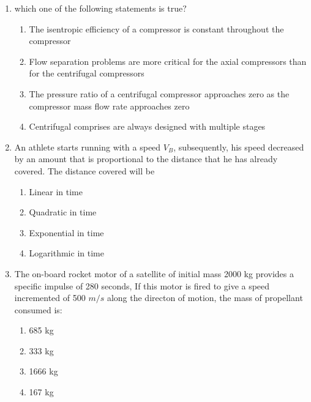 \documentclass[journal]{IEEEtran}
\begin{document}
\begin{enumerate}[start=35]
\begin{multicols}{2}
\begin{enumerate}
        \item Nickel alloy 
        \item Aluminum alloy
    \end{enumerate}
\end{multicols}
\item which one of the following statements is true$?$
\begin{enumerate}
        \item The isentropic efficiency of a compressor is constant throughout the compressor 
        \item Flow separation problems are more critical for the axial compressors than for the centrifugal compressors
        \item The pressure ratio of a centrifugal compressor approaches zero as the compressor mass flow rate approaches zero
        \item Centrifugal comprises are always designed with multiple stages
    \end{enumerate}
\item  An athlete starts running with a speed  $V_B$, subsequently, his speed decreased by an amount that is proportional to the distance that he has already covered. The distance covered will be
\begin{enumerate}
       \item Linear in time
       \item Quadratic in time
       \item Exponential in time
       \item Logarithmic in time 
   \end{enumerate}
\item The on-board rocket motor of a satellite of initial mass 2000 kg provides a specific impulse of 280 seconds, If this motor is fired to give a speed incremented of 500 $m/s$ along the directon of motion, the mass of propellant consumed is$:$
\begin{multicols}{4}
    \begin{enumerate}
        \item 685 kg
        \item 333 kg
        \item 1666 kg
        \item 167 kg
    \end{enumerate}
\end{multicols}
\end{enumerate}
\end{document}
